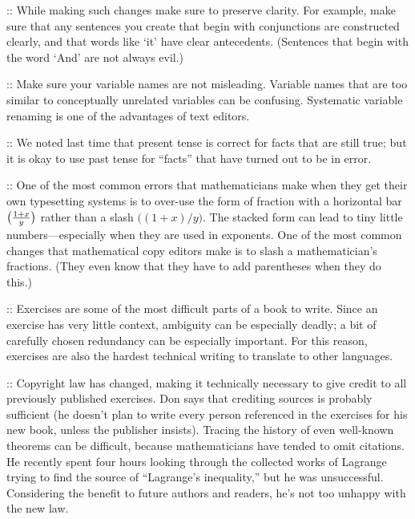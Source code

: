 \smallskip
\display 30pt::
    While making such changes make sure to preserve clarity.  For example,
    make sure that any sentences you create that begin with conjunctions are
    constructed clearly, and that words like `it' have clear antecedents.
    (Sentences that begin with the word `And' are not always evil.)
    
\smallskip
\display 30pt::
    Make sure your variable names are not misleading.  Variable names that
    are too similar to conceptually unrelated variables can be confusing.
Systematic  variable renaming is one of the advantages of text editors.
    
\smallskip
\display 30pt::
We noted last time that present tense is correct for facts
    that are still true; but it is okay to use past tense for ``facts'' that 
have turned     out to be in error.
    
\smallskip
\display 30pt::
    One of the most common errors that mathematicians make when they get their
    own typesetting systems is to over-use the form of fraction with a
    horizontal bar $\bigl({1+x\over y}\bigr)$ rather than a slash 
$\bigl((1+x)/y\bigr)$.
The stacked form can lead to tiny little
    numbers---especially when they are used in exponents.  One of the most
    common changes that mathematical copy editors make is to slash 
a mathematician's fractions.
(They even know that they have to add parentheses when
    they do this.)
    
\smallskip
\display 30pt::
    Exercises are some of the most difficult parts of a book to write.
    Since an exercise has
very little context, ambiguity can be especially deadly; a bit of carefully chosen
    redundancy can be especially important.  For this reason, exercises are also
    the hardest technical writing to translate to other languages.
    
\smallskip
\display 30pt::
    Copyright law has changed, making it technically necessary to give credit to
    all previously published exercises.  Don says that crediting sources is
    probably sufficient (he doesn't plan to write every person referenced in
    the exercises for his new book, unless the publisher insists).
Tracing the
    history of even well-known theorems can be difficult, because mathematicians
have tended to omit citations.
He recently spent four
    hours looking through the collected works of Lagrange trying to find the
source of ``Lagrange's inequality,'' but he was unsuccessful.
Considering the benefit to future authors and readers,
 he's not too unhappy with the new law.
    
